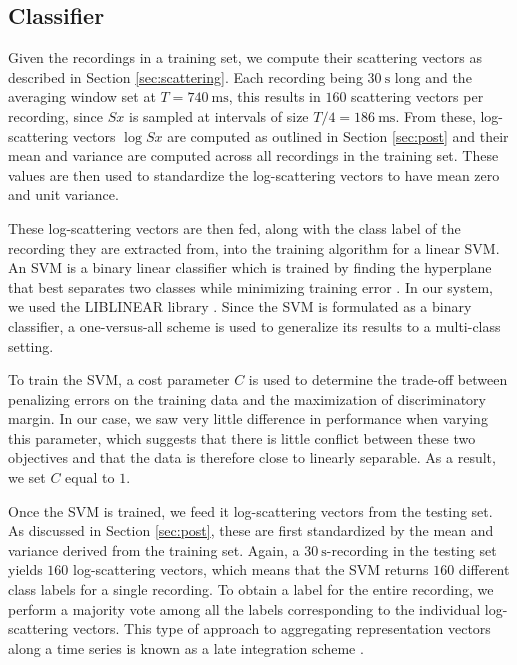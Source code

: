 \documentclass{article}
\begin{document}
\begin{sloppy}
\section{Classifier}
\label{sec:classifier}

Given the recordings in a training set, we compute their scattering vectors as described in Section \ref{sec:scattering}. Each recording being $30~\mathrm{s}$ long and the averaging window set at $T = 740~\mathrm{ms}$, this results in $160$ scattering vectors per recording, since $Sx$ is sampled at intervals of size $T/4 = 186~\mathrm{ms}$. From these, log-scattering vectors $\log Sx$ are computed as outlined in Section \ref{sec:post} and their mean and variance are computed across all recordings in the training set. These values are then used to standardize the log-scattering vectors to have mean zero and unit variance.

These log-scattering vectors are then fed, along with the class label of the recording they are extracted from, into the training algorithm for a linear SVM. An SVM is a binary linear classifier which is trained by finding the hyperplane that best separates two classes while minimizing training error \cite{vapnik}. In our system, we used the LIBLINEAR library \cite{liblinear}. Since the SVM is formulated as a binary classifier, a one-versus-all scheme is used to generalize its results to a multi-class setting.

To train the SVM, a cost parameter $C$ is used to determine the trade-off between penalizing errors on the training data and the maximization of discriminatory margin. In our case, we saw very little difference in performance when varying this parameter, which suggests that there is little conflict between these two objectives and that the data is therefore close to linearly separable. As a result, we set $C$ equal to $1$.

Once the SVM is trained, we feed it log-scattering vectors from the testing set. As discussed in Section \ref{sec:post}, these are first standardized by the mean and variance derived from the training set. Again, a $30~\mathrm{s}$-recording in the testing set yields $160$ log-scattering vectors, which means that the SVM returns $160$ different class labels for a single recording. To obtain a label for the entire recording, we perform a majority vote among all the labels corresponding to the individual log-scattering vectors. This type of approach to aggregating representation vectors along a time series is known as a late integration scheme \cite{kittler}.


\end{sloppy}
\end{document}
